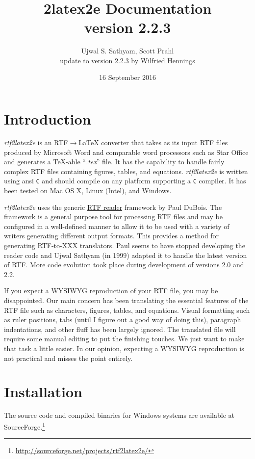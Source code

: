 \documentclass{article}
\title{\rtf2latex2e Documentation\\
version 2.2.3}
\author{Ujwal S. Sathyam, Scott Prahl\\ update to version 2.2.3 by Wilfried Hennings}
\date{16 September 2016}
\def\rtf2latex2e{{\it rtf2latex2e}}
\begin{document}
 
\maketitle

\section{Introduction 
\label{intro}} \rtf2latex2e is an RTF$\rightarrow${\LaTeX}
converter that takes as its input RTF files produced by Microsoft Word
and comparable word processors such as Star Office and generates a
\TeX-able ``{\it .tex}'' file.  It has the capability to handle fairly
complex RTF files containing figures, tables, and equations.  
\rtf2latex2e is written using ansi \texttt{C} and
should compile on any platform supporting a \texttt{C} compiler.  It has
been tested on Mac OS X, Linux (Intel), and Windows.

\rtf2latex2e uses the generic
\href{http://www.snake.net/software/RTF/}{RTF reader}
framework by Paul DuBois.  The framework is a general purpose tool for
processing RTF files and may be configured in a well-defined manner to
allow it to be used with a variety of writers generating different
output formats.  This provides a method for generating RTF-to-XXX
translators.  Paul seems to have stopped developing the
reader code and Ujwal Sathyam (in 1999) adapted it to handle the
latest version of RTF.  More code evolution took place during
development of versions 2.0 and 2.2.

If you expect a WYSIWYG reproduction of your RTF file, you may be
disappointed.  Our main concern has been translating the essential
features of the RTF file such as characters, figures, tables, and
equations.  Visual formatting
such as ruler positions, tabs (until I figure out a good way of doing
this), paragraph indentations, and other fluff has been largely ignored.  
The translated {\LaTeXe} file will require some manual editing to put the
finishing touches.  We just want to make that task a little easier.  In
our opinion, expecting a WYSIWYG reproduction is not practical and
misses the point entirely.

\section{Installation}
The source code and compiled binaries for Windows systems are available at
SourceForge.\footnote{\url{http://sourceforge.net/projects/rtf2latex2e/}}
\end{document}
